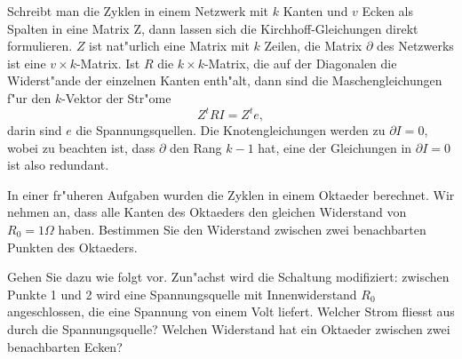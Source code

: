 Schreibt man die Zyklen in einem Netzwerk mit $k$ Kanten und $v$ Ecken
als Spalten in eine Matrix Z,
dann lassen sich die Kirchhoff-Gleichungen direkt formulieren.
$Z$ ist nat"urlich eine Matrix mit $k$ Zeilen, die Matrix $\partial$
des Netzwerks ist eine $v\times k$-Matrix.
Ist $R$ die $k\times k$-Matrix, die auf der Diagonalen die Widerst"ande der
einzelnen Kanten enth"alt, dann sind die Maschengleichungen f"ur den
$k$-Vektor der Str"ome 
\[
Z^tRI=Z^te,
\]
darin sind $e$ die Spannungsquellen.
Die Knotengleichungen werden zu $\partial I=0$, wobei zu beachten ist,
dass $\partial$ den Rang $k-1$ hat, eine der Gleichungen in $\partial I=0$ 
ist also redundant.

In einer fr"uheren Aufgaben wurden die Zyklen in einem Oktaeder berechnet.
Wir nehmen an, dass alle Kanten des Oktaeders den gleichen Widerstand von
$R_0=1\Omega$ haben. Bestimmen Sie den Widerstand zwischen zwei benachbarten
Punkten des Oktaeders.

\begin{hinweis}
Gehen Sie dazu wie folgt vor.
Zun"achst wird die Schaltung modifiziert: zwischen Punkte 1 und 2 wird eine
Spannungsquelle mit Innenwiderstand $R_0$ angeschlossen,
die eine Spannung von einem Volt liefert.
Welcher Strom fliesst aus durch die Spannungsquelle? Welchen Widerstand
hat ein Oktaeder zwischen zwei benachbarten Ecken?
\end{hinweis}

